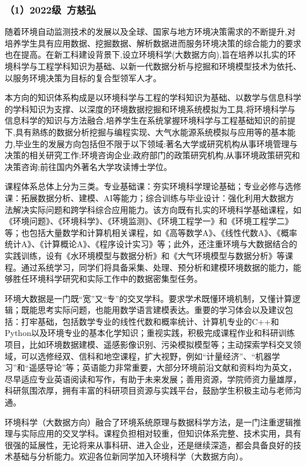 \documentclass[11pt,oneside]{book}
\begin{document}
\subsubsection{（1）2022级\ 方慈弘}

随着环境自动监测技术的发展以及全球、国家与地方环境决策需求的不断提升,对培养学生具有应用数据、挖掘数据、解析数据进而服务环境决策的综合能力的要求也在提高。在新工科建设背景下,设立环境科学(大数据方向),旨在培养以扎实的环境科学与工程学科知识为基础、以新一代数据分析与挖掘和环境模型技术为依托、以服务环境决策为目标的复合型领军人才。

本方向的知识体系构成是以环境科学与工程的学科知识为基础、以数学与信息科学的学科知识为支撑、以深度的环境数据挖掘和环境系统模拟为工具,将环境科学与信息科学的知识与方法融合,培养学生在系统掌握环境科学与工程基础知识的前提下,具有熟练的数据分析挖掘与编程实现、大气水能源系统模拟与应用等的基本能力,毕业生的发展方向包括但不限于以下领域:著名大学或研究机构从事环境管理与决策的相关研究工作;环境咨询企业;政府部门的政策研究机构,从事环境政策研究和决策咨询;前往国内外著名大学攻读博士学位。

课程体系总体上分为三类。专业基础课：夯实环境科学理论基础；专业必修与选修课：拓展数据分析、建模、AI等能力；综合训练与毕业设计：强化利用大数据方法解决实际问题和跨学科综合应用能力。该方向既有扎实的环境科学基础课程，如《环境问题》、《环境科学》、《环境监测》、《环境工程学一》和《环境工程学二》等；也包括大量数学和计算机相关课程，如《高等数学A》、《线性代数A》、《概率统计A》、《计算概论A》、《程序设计实习》等；此外，还注重环境与大数据结合的实践训练，设有《水环境模型与数据分析》和《大气环境模型与数据分析》等课程。通过系统学习，同学们将具备采集、处理、预分析和建模环境数据的能力，能够胜任环境科学研究和实际工作中的数据密集型任务。

环境大数据是一门既“宽”又“专”的交叉学科。要求学术既懂环境机制，又懂计算逻辑；既能思考实际问题，也能用数学语言建模表达。重要的学习体会以及建议包括：打牢基础，包括数学专业的线性代数和概率统计、计算机专业的C++和Python以及环境专业的基本化学知识；重视实践，积极完成课程作业和科研训练项目，比如环境数据建模、遥感影像识别、污染模拟模型等；主动探索学科交叉领域，可以选修经双、信科和地空课程，扩大视野，例如“计量经济”、“机器学习”和“遥感导论”等；英语能力非常重要，大部分环境前沿文献和资料均为英文，尽早适应专业英语阅读和写作，有助于未来发展；善用资源，学院师资力量雄厚，科研氛围浓厚，拥有丰富的科研项目资源与实践平台，鼓励学生积极主动与老师沟通。

环境科学（大数据方向）融合了环境系统原理与数据科学方法，是一门注重逻辑推理与实际应用的交叉学科。课程负担相对较重，但知识体系完整、技术实用，具有很强的延展性，无论将来从事科研、进入企业，还是继续深造，都会具备良好的技术基础与分析能力。欢迎各位新同学加入环境科学（大数据方向）。
	
\end{document}
